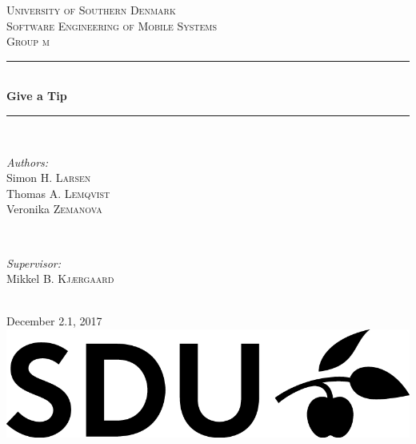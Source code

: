 \documentclass[12pt]{article}
\begin{document}
\listoftodos

\begin{titlepage}

\newcommand{\HRule}{\rule{\linewidth}{0.5mm}} %

\center %
 

\textsc{\LARGE University of Southern Denmark}\\[1.5cm] %
\textsc{\Large Software Engineering of Mobile Systems}\\[0.5cm] %
\textsc{\large Group m}\\[0.5cm] %


\HRule \\[0.4cm]
{ \huge \bfseries Give a Tip}\\[0.4cm] 
\HRule \\[1.5cm]
 

\begin{minipage}[t]{0.4\textwidth}
\begin{flushleft} \large
\emph{Authors:}\\
Simon \textsc{H. Larsen}\\
Thomas \textsc{A. Lemqvist}\\
Veronika \textsc{Zemanova}\\
\end{flushleft}
\end{minipage}
~
\begin{minipage}[t]{0.4\textwidth}
\begin{flushright} \large
\emph{Supervisor:} \\
Mikkel \textsc{B. Kjærgaard}
\end{flushright}
\end{minipage}\\[2cm]

{\large December 2.1, 2017}\\[2cm] 

\includegraphics{images/logo.png}\\[1cm]

\vfill 

\end{titlepage}


\begin{abstract}

\end{abstract}

\vfill

\setcounter{tocdepth}{2}
\tableofcontents

\clearpage


\end{document}
